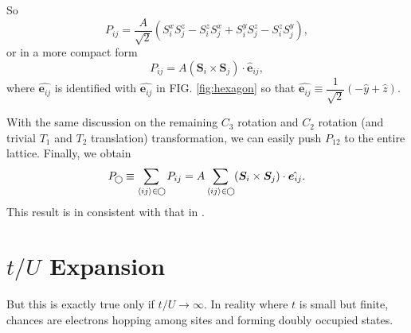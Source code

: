\documentclass[10pt,nofootinbib]{revtex4}
\newcommand\hexagon{\mathop{\begin{tikzpicture}[scale=0.06,baseline]
		\draw (0,-1) -- (1.732,0) -- (1.732,2) -- (0,3) -- (-1.732,2) -- (-1.732,0) -- (0,-1);
	\end{tikzpicture}}}
\begin{document}
		So
		\begin{equation*}
			P_{ij}=\dfrac{A}{\sqrt{2}}(S_i^xS_j^z-S_i^zS_j^x+S_i^yS_j^z-S_i^zS_j^y),
		\end{equation*}
		or in a more compact form
		\begin{equation}\label{3.1.4}
			P_{ij}=A(\bm{S}_i\times\bm{S}_j)\cdot\hat{\bm{e}}_{ij},
		\end{equation}
		where $\hat{\bm{e}_{ij}}$ is identified with $\hat{\bm{e}_{ij}}$ in FIG. \ref{fig:hexagon} so that $\hat{\bm{e}_{ij}}\equiv\dfrac{1}{\sqrt{2}}(-\hat{y}+\hat{z})$.\par
		With the same discussion on the remaining $C_3$ rotation and $C_2$ rotation (and trivial $T_1$ and $T_2$ translation) transformation, we can easily push $P_{12}$ to the entire lattice. Finally, we obtain
		\begin{equation}\label{3.1.5}
			P_{\hexagon}\equiv\sum_{\langle ij \rangle \in\hexagon}P_{ij}=A\sum_{\langle ij \rangle \in \hexagon}(\bm{S}_i\times\bm{S}_j)\cdot\hat{\bm{e}_{ij}}.
		\end{equation}
		This result is in consistent with that in \cite{bolens2018mechanism}.

\section{$t/U$ Expansion}
	But this is exactly true only if $t/U\rightarrow\infty$. In reality where $t$ is small but finite, chances are electrons hopping among sites and forming doubly occupied states.



\end{document}
